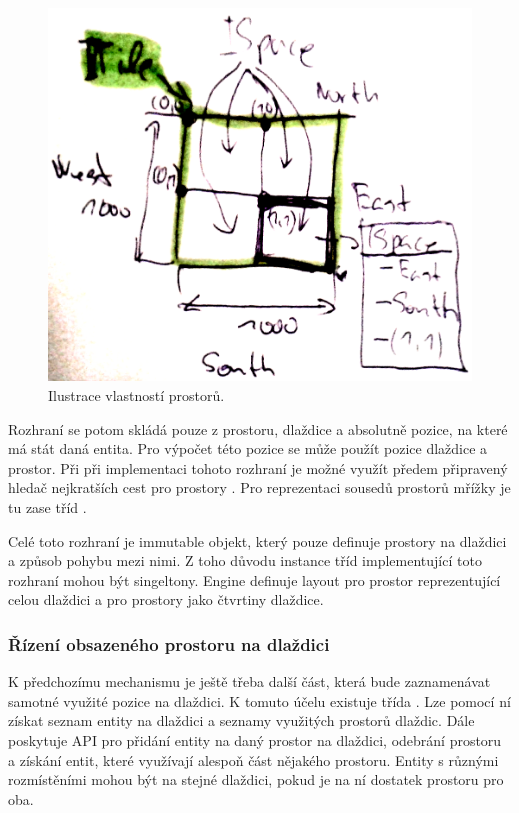 \begin{figure}[H]\centering
\includegraphics[width=\textwidth]{./img/tile-spaces.png}
\caption{Ilustrace vlastností prostorů. }
\label{floor-side}
\end{figure}

Rozhraní  se potom skládá pouze z prostoru, dlaždice a absolutně pozice, na které má stát daná entita.
Pro výpočet této pozice se může použít pozice dlaždice a prostor. Při při implementaci tohoto rozhraní je možné využít 
předem připravený hledač nejkratších cest pro prostory . Pro reprezentaci sousedů prostorů mřížky je tu 
zase tříd .

Celé toto rozhraní je immutable objekt, který pouze definuje prostory na dlaždici a způsob pohybu mezi nimi. Z toho důvodu
instance tříd implementující toto rozhraní mohou být singeltony. Engine definuje layout pro prostor reprezentující celou dlaždici
a pro prostory jako čtvrtiny dlaždice.

\subsubsection{Řízení obsazeného prostoru na dlaždici}

K předchozímu mechanismu je ještě třeba další část, která bude zaznamenávat samotné využité pozice na dlaždici. K tomuto 
účelu existuje třída .  Lze pomocí ní získat seznam entity na dlaždici a seznamy využitých prostorů dlaždic.
Dále poskytuje API pro přidání entity na daný prostor na dlaždici, odebrání prostoru a získání entit, které využívají 
alespoň část nějakého prostoru. Entity s různými rozmístěními mohou být na stejné dlaždici, pokud
je na ní dostatek prostoru pro oba.

